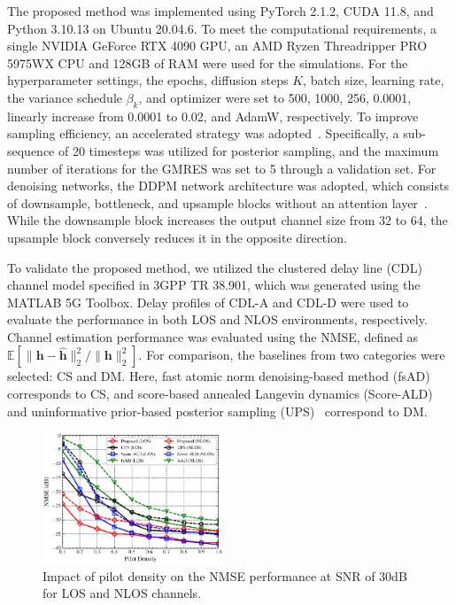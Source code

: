 \documentclass[lettersize,journal]{IEEEtran}
\begin{document}
The proposed method was implemented using PyTorch 2.1.2, CUDA 11.8, and Python 3.10.13 on Ubuntu 20.04.6. To meet the computational requirements, a single NVIDIA GeForce RTX 4090 GPU, an AMD Ryzen Threadripper PRO 5975WX CPU and 128GB of RAM were used for the simulations. For the hyperparameter settings, the epochs, diffusion steps $K$, batch size, learning rate, the variance schedule $\beta_{k}$, and optimizer were set to 500, 1000, 256, 0.0001, linearly increase from 0.0001 to 0.02, and AdamW, respectively.
To improve sampling efficiency, an accelerated strategy was adopted~\cite{songDenoisingDiffusionImplicit2020}. Specifically, a sub-sequence of 20 timesteps was utilized for posterior sampling, and the maximum number of iterations for the GMRES was set to 5 through a validation set. For denoising networks, the DDPM network architecture was adopted, which consists of downsample, bottleneck, and upsample blocks without an attention layer~\cite{hoDenoisingDiffusionProbabilistic2020}. While the downsample block increases the output channel size from 32 to 64, the upsample block conversely reduces it in the opposite direction.

To validate the proposed method, we utilized the clustered delay line (CDL) channel model specified in 3GPP TR 38.901, which was generated using the MATLAB 5G Toolbox. Delay profiles of CDL-A and CDL-D were used to evaluate the performance in both LOS and NLOS environments, respectively. Channel estimation performance was evaluated using the NMSE, defined as $\mathbb{E}[\|\mathbf{h}-\hat{\mathbf{h}}\|_{2}^{2} / \|\mathbf{h}\|_{2}^{2}]$. For comparison, the baselines from two categories were selected: CS and DM. Here, fast atomic norm denoising-based method (fsAD)~\cite{zhangAtomicNormDenoisingBased2018} corresponds to CS, and score-based annealed Langevin dynamics (Score-ALD)~\cite{arvinteMIMOChannelEstimation2023} and uninformative prior-based posterior sampling (UPS)~\cite{zhouGenerativeDiffusionModels2025} correspond to DM.


\begin{figure}[!t]
\includegraphics[width=0.48\textwidth]{images/20251014/fig_1.eps}
\caption{Impact of pilot density on the NMSE performance at SNR of 30dB for LOS and NLOS channels.}
\label{fig_sim_1}
\end{figure}
\end{document}
